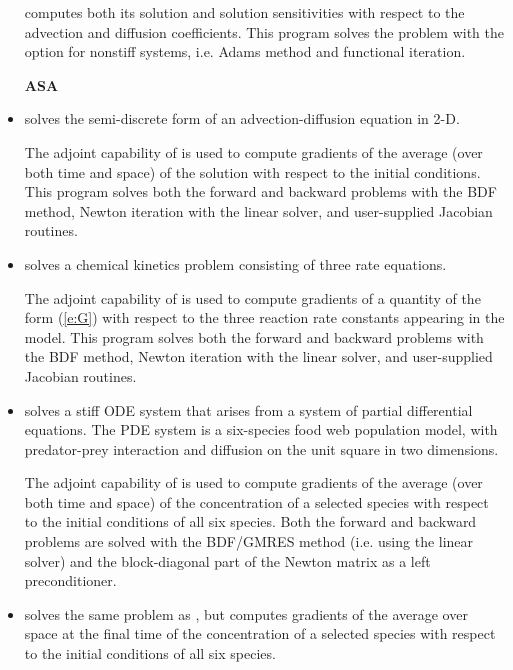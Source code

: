 \begin{itemize}
  {\cvodes} computes both its solution and solution sensitivities with respect
  to the advection and diffusion coefficients.
  This program solves the problem with the option for nonstiff systems,
  i.e. Adams method and functional iteration.

\item[{\bf ASA}]

\item {}
  solves the semi-discrete form of an advection-diffusion equation in 2-D.

  The adjoint capability of {\cvodes} is used to compute gradients
  of the average (over both time and space) of the solution with respect to
  the initial conditions.
  This program solves both the forward and backward problems with the BDF method, 
  Newton iteration with the {\cvband} linear solver, and user-supplied     
  Jacobian routines.

\item {}
  solves a chemical kinetics problem consisting of three rate equations.
  
  The adjoint capability of {\cvodes} is used to compute gradients
  of a quantity of the form (\ref{e:G}) with respect to the three
  reaction rate constants appearing in the model.
  This program solves both the forward and backward problems with the BDF method, 
  Newton iteration with the {\cvdense} linear solver, and user-supplied    
  Jacobian routines.

\item {}
  solves a stiff ODE system that arises from a system     
  of partial differential equations.  The PDE system is a six-species
  food web population model, with predator-prey interaction and diffusion 
  on the unit square in two dimensions.

  The adjoint capability of {\cvodes} is used to compute gradients
  of the average (over both time and space) of the concentration of a selected species
  with respect to the initial conditions of all six species.
  Both the forward and backward problems are solved with the BDF/GMRES method 
  (i.e. using the {\cvspgmr} linear solver) and the block-diagonal part of the  
  Newton matrix as a left preconditioner.

\item {}
  solves the same problem as , but computes gradients
  of the average over space at the final time of the concentration of a selected species
  with respect to the initial conditions of all six species.

\end{itemize}

